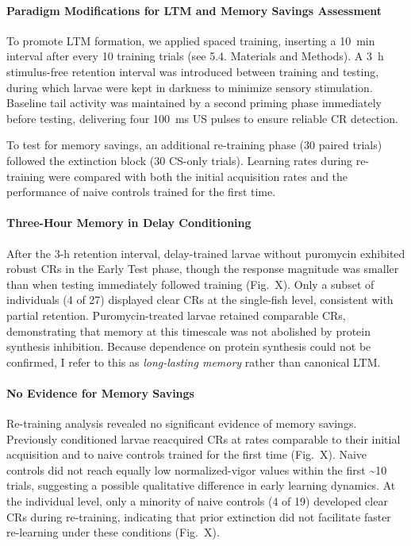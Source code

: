 \paragraph{Paradigm Modifications for LTM and Memory Savings Assessment}
To promote LTM formation, we applied spaced training, inserting a \SI{10}{\minute} interval after every 10 training trials (see 5.4. Materials and Methods). A \SI{3}{\hour} stimulus-free retention interval was introduced between training and testing, during which larvae were kept in darkness to minimize sensory stimulation. Baseline tail activity was maintained by a second priming phase immediately before testing, delivering four \SI{100}{\milli\second} US pulses to ensure reliable CR detection.

To test for memory savings, an additional re-training phase (30 paired trials) followed the extinction block (30 CS-only trials). Learning rates during re-training were compared with both the initial acquisition rates and the performance of naive controls trained for the first time.

\paragraph{Three-Hour Memory in Delay Conditioning}
After the 3-h retention interval, delay-trained larvae without puromycin exhibited robust CRs in the Early Test phase, though the response magnitude was smaller than when testing immediately followed training (Fig.~X). Only a subset of individuals (4 of 27) displayed clear CRs at the single-fish level, consistent with partial retention. Puromycin-treated larvae retained comparable CRs, demonstrating that memory at this timescale was not abolished by protein synthesis inhibition. Because dependence on protein synthesis could not be confirmed, I refer to this as \textit{long-lasting memory} rather than canonical LTM.

\paragraph{No Evidence for Memory Savings}
Re-training analysis revealed no significant evidence of memory savings. Previously conditioned larvae reacquired CRs at rates comparable to their initial acquisition and to naive controls trained for the first time (Fig.~X). Naive controls did not reach equally low normalized-vigor values within the first \textasciitilde10 trials, suggesting a possible qualitative difference in early learning dynamics. At the individual level, only a minority of naive controls (4 of 19) developed clear CRs during re-training, indicating that prior extinction did not facilitate faster re-learning under these conditions (Fig.~X).

